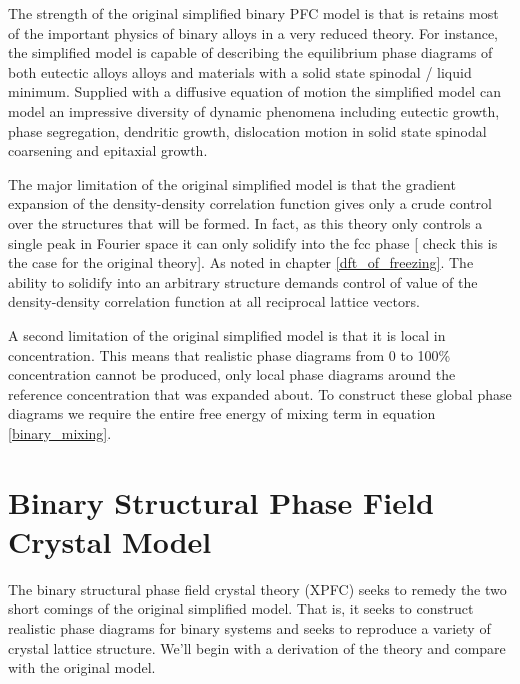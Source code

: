 The strength of the original simplified binary PFC model is that is retains
most of the important physics of binary alloys in a very reduced theory. For
instance, the simplified model is capable of describing the equilibrium phase
diagrams of both eutectic alloys alloys and materials with a solid state
spinodal / liquid minimum.  Supplied with a diffusive equation of motion the
simplified model can model an impressive diversity of dynamic phenomena
including eutectic growth, phase segregation, dendritic growth, dislocation
motion in solid state spinodal coarsening and epitaxial growth.

The major limitation of the original simplified model is that the gradient
expansion of the density-density correlation function gives only a crude
control over the structures that will be formed. In fact, as this theory only
controls a single peak in Fourier space it can only solidify into the fcc phase
[{\color{ForestGreen} check this is the case for the original theory}]. As
noted in chapter \ref{dft_of_freezing}. The ability to solidify into an
arbitrary structure demands control of value of the density-density correlation
function at all reciprocal lattice vectors.

A second limitation of the original simplified model is that it is local in
concentration. This means that realistic phase diagrams from 0 to 100\%
concentration cannot be produced, only local phase diagrams around the
reference concentration that was expanded about. To construct these global
phase diagrams we require the entire free energy of mixing term in equation
\ref{binary_mixing}.

\section{Binary Structural Phase Field Crystal Model} %

The binary structural phase field crystal theory (XPFC) seeks to remedy the two
short comings of the original simplified model. That is, it seeks to construct
realistic phase diagrams for binary systems and seeks to reproduce a variety 
of crystal lattice structure. We'll begin with a derivation of the theory and
compare with the original model.

